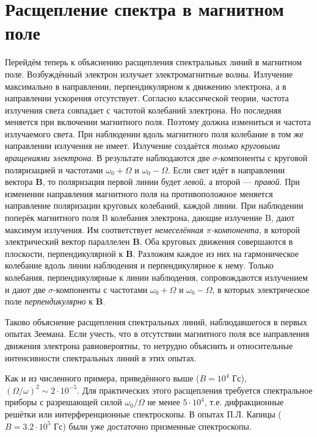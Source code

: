 \documentclass[12pt]{article}
\begin{document}
  \section{Расщепление спектра в магнитном поле}
  Перейдём теперь к объяснению расщепления спектральных линий в магнитном поле. Возбуждённый электрон излучает электромагнитные волны. Излучение максимально в направлении, перпендикулярном к движению электрона, а в направлении ускорения отсутствует. Согласно классической теории, частота излучения света совпадает с частотой колебаний электрона. Но последняя меняется при включении магнитного поля. Поэтому должна измениться и частота излучаемого света. При наблюдении вдоль магнитного поля колебание в том же направлении излучения не имеет. Излучение создаётся \textit{только круговыми вращениями электрона}. В результате наблюдаются две $\sigma$-компоненты с круговой поляризацией и частотами $\omega_0 + \Omega$ и $\omega_0 - \Omega$. Если свет идёт в направлении вектора $\mathbf{B}$, то поляризация первой линии будет \textit{левой}, а второй — \textit{правой}. При изменении направления магнитного поля на противоположное меняется направление поляризации круговых колебаний, каждой линии. При наблюдении поперёк магнитного поля B колебания электрона, дающие излучение B, дают максимум излучения. Им соответствует \textit{немеселённая $\pi$-компонента}, в которой электрический вектор параллелен $\mathbf{B}$. Оба круговых движения совершаются в плоскости, перпендикулярной к $\mathbf{B}$. Разложим каждое из них на гармоническое колебание вдоль линии наблюдения и перпендикулярное к нему. Только колебания, перпендикулярные к линии наблюдения, сопровождаются излучением и дают две $\sigma$-компоненты с частотами $\omega_0 + \Omega$ и $\omega_0 - \Omega$, в которых электрическое поле \textit{перпендикулярно} к $\mathbf{B}$.

  Таково объяснение расщепления спектральных линий, наблюдавшегося в первых опытах Зеемана. Если учесть, что в отсутствии магнитного поля все направления движения электрона равновероятны, то нетрудно объяснить и относительные интенсивности спектральных линий в этих опытах.

  Как и из численного примера, приведённого выше ($B = 10^4$ Гс), $(\Omega/\omega)^2 \sim 2 \cdot 10^{-5}$. Для практических этого расщепления требуется спектральное приборы с разрешающей силой $\omega_0 / \Omega$ не менее $5 \cdot 10^4$, т.е. дифракционные решётки или интерференционные спектроскопы. В опытах П.Л. Капицы ($B = 3.2 \cdot 10^5$ Гс) были уже достаточно призменные спектроскопы.
\end{document}
